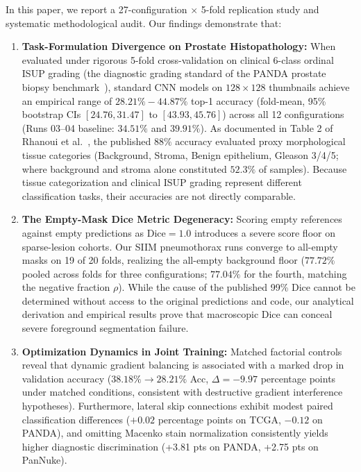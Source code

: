 \documentclass[preprint,12pt]{elsarticle}
\begin{document}
In this paper, we report a 27-configuration $\times$ 5-fold replication study and systematic methodological audit. Our findings demonstrate that:
\begin{enumerate}
    \item \textbf{Task-Formulation Divergence on Prostate Histopathology:} When evaluated under rigorous 5-fold cross-validation on clinical 6-class ordinal ISUP grading (the diagnostic grading standard of the PANDA prostate biopsy benchmark~\cite{bulten2022artificial}), standard CNN models on $128 \times 128$ thumbnails achieve an empirical range of $28.21\%-44.87\%$ top-1 accuracy (fold-mean, 95\% bootstrap CIs $[24.76, 31.47]$ to $[43.93, 45.76]$) across all 12 configurations (Runs 03--04 baseline: $34.51\%$ and $39.91\%$). As documented in Table 2 of Rhanoui et al.~\cite{rhanoui2025multitask}, the published $88\%$ accuracy evaluated proxy morphological tissue categories (Background, Stroma, Benign epithelium, Gleason 3/4/5; where background and stroma alone constituted $52.3\%$ of samples). Because tissue categorization and clinical ISUP grading represent different classification tasks, their accuracies are not directly comparable.
    \item \textbf{The Empty-Mask Dice Metric Degeneracy:} Scoring empty references against empty predictions as $\text{Dice} = 1.0$ introduces a severe score floor on sparse-lesion cohorts. Our SIIM pneumothorax runs converge to all-empty masks on 19 of 20 folds, realizing the all-empty background floor ($77.72\%$ pooled across folds for three configurations; $77.04\%$ for the fourth, matching the negative fraction $\rho$). While the cause of the published 99\% Dice cannot be determined without access to the original predictions and code, our analytical derivation and empirical results prove that macroscopic Dice can conceal severe foreground segmentation failure.
    \item \textbf{Optimization Dynamics in Joint Training:} Matched factorial controls reveal that dynamic gradient balancing is associated with a marked drop in validation accuracy ($38.18\% \to 28.21\%$ Acc, $\Delta = -9.97$ percentage points under matched conditions, consistent with destructive gradient interference hypotheses). Furthermore, lateral skip connections exhibit modest paired classification differences ($+0.02$ percentage points on TCGA, $-0.12$ on PANDA), and omitting Macenko stain normalization consistently yields higher diagnostic discrimination (+3.81 pts on PANDA, +2.75 pts on PanNuke).
\end{enumerate}
\end{document}
